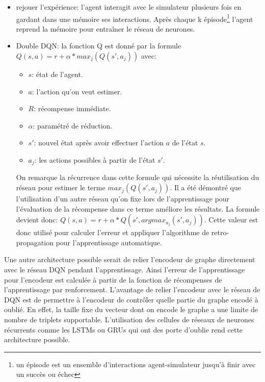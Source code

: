 \begin{itemize}
	\item rejouer l'expérience: l'agent interagit avec le simulateur plusieurs fois en gardant dans une mémoire ses interactions. Après chaque k épisode\footnote{un épisode est un ensemble d'interactions agent-simulateur jusqu'à finir avec un succès ou échec} l'agent reprend la mémoire pour entraîner le réseau de neurones.
	\item Double DQN: la fonction Q est donné par la formule $Q(s,a) = r + \alpha*max_j(Q(s',a_j))$ avec:
	\begin{itemize}
		\item $s$: état de l'agent.
		\item $a$: l'action qu'on veut estimer.
		\item $R$: récompense immédiate.
		\item $\alpha$: paramétré de réduction.
		\item $s'$: nouvel état après avoir effectuer l'action $a$ de l'état $s$.
		\item $a_j$: les actions possibles à partir de l'état $s'$.
	\end{itemize}
	On remarque la récurrence dans cette formule qui nécessite la réutilisation du réseau pour estimer le terme $max_j (Q(s',a_j))$. Il a été démontré que l'utilisation d'un autre réseau qu'on fixe lors de l'apprentissage pour l'évaluation de la récompense dans ce terme améliore les résultats\cite{Mnih2015}. La formule devient donc: $Q(s,a) = r + \alpha*Q(s',argmax_{a_j}(s',a_j))$. Cette valeur est donc utilisé pour calculer l'erreur et appliquer l'algorithme de retro-propagation pour l'apprentissage automatique.
\end{itemize}
Une autre architecture possible serait de relier l'encodeur de graphe directement avec le réseau DQN pendant l'apprentissage. Ainsi l'erreur de l'apprentissage pour l'encodeur est calculée à partir de la fonction de récompenses de l'apprentissage par renforcement. L'avantage de relier l'encodeur avec le réseau de DQN est de permettre à l'encodeur de contrôler quelle partie du graphe encodé à oublié. En effet, la taille fixe du vecteur dont on encode le graphe a une limite de nombre de triplets supportable. L'utilisation des cellules de réseaux de neurones récurrents comme les LSTMs ou GRUs qui ont des porte d'oublie rend cette architecture possible.
